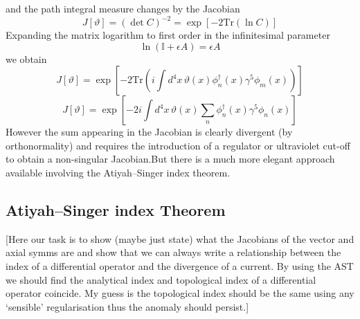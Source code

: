 \documentclass[11pt, a4paper]{article}
\theoremstyle{definition}
\theoremstyle{plain}
\begin{document}
and the path integral measure changes by the Jacobian
\begin{equation}
  J[\vartheta] = {(\det{C})}^{-2} = \exp\left[-2 \mathrm{Tr}(\ln{C}) \right]
\end{equation}
Expanding the matrix logarithm to first order in the infinitesimal parameter
\begin{equation}
  \ln{(\mathbb{I} + \epsilon A)} = \epsilon A
\end{equation}
we obtain
\begin{equation}
  J[\vartheta] = \exp{\left[-2\mathrm{Tr}\left(i
  \int{d^4x\,  \vartheta(x)\phi_{n}^{\dagger}(x)\gamma^5\phi_m(x)} \right) \right]}
\end{equation}
\begin{equation}
  J[\vartheta] = \exp{\left[ -2i
  \int{d^4x\,\vartheta(x) \sum_n{\phi_{n}^{\dagger}(x)\gamma^5\phi_n(x)}} \right]}
\end{equation}
However the sum appearing in the Jacobian is clearly divergent (by orthonormality)
and requires the introduction of a regulator or ultraviolet cut-off to obtain a
non-singular Jacobian.But there is a much more elegant approach available involving 
the Atiyah–Singer index theorem.

\subsection{Atiyah–Singer index Theorem}

[Here our task is to show (maybe just state) what the Jacobians of the vector and axial 
symms are and show that we can always write a relationship between the
index of a differential operator and the divergence of a current. By using
the AST we should find the analytical index and topological index of
a differential operator coincide. My guess is the topological index should
be the same using any `sensible' regularisation thus the anomaly should
persist.]
\end{document}
